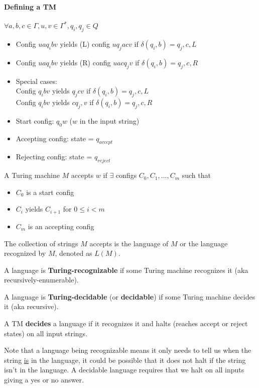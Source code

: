 \documentclass[12 pt]{article}
\begin{document}
\paragraph{Defining a TM}
$\forall a,b,c \in  \Gamma, u, v \in \Gamma^*, q_i, q_j \in Q$
\begin{itemize}
\item Config $uaq_i b v$ yields (L) config $uq_j ac v$ if $\delta(q_i, b)
  = q_j, c, L$
\item Config $uaq_i b v$ yields (R) config $uacq_j v$ if $\delta(q_i, b) =
  q_j,c,R$
\item Special cases:
  \\ Config $q_i b v$ yields $q_j c v$ if $\delta(q_i, b) = q_j,c,L$
  \\ Config $q_i b v$ yields $cq_j,v$ if $\delta(q_i, b) = q_j, c, R$
\item Start config: $q_0 w$ ($w$ in the input string)
\item Accepting config: state = $q_{accept}$
\item Rejecting config: state = $q_{reject}$
\end{itemize}
A Turing machine $M$ accepts $w$ if $\exists$ configs $C_0, C_1,
\ldots, C_m$ such that
\begin{itemize}
\item $C_0$ is a start config
\item $C_i$ yields $C_{i+1}$ for $0 \leq i < m$
\item $C_m$ is an accepting config
\end{itemize}
The collection of strings $M$ accepts is the language of $M$ or the
language recognized by $M$, denoted as $L(M)$.

A language is \textbf{Turing-recognizable} if some Turing machine
recognizes it (aka recursively-enumerable).

A language is \textbf{Turing-decidable} (or \textbf{decidable}) if
some Turing machine decides it (aka recursive).

A TM \textbf{decides} a language if it recognizes it and halts
(reaches accept or reject states) on all input strings.

Note that a language being recognizable means it only needs to tell us
when the string \underline{is} in the language, it could be possible
that it does not halt if the string isn't in the language. A decidable
language requires that we halt on all inputs giving a yes or no
answer.
\end{document}
